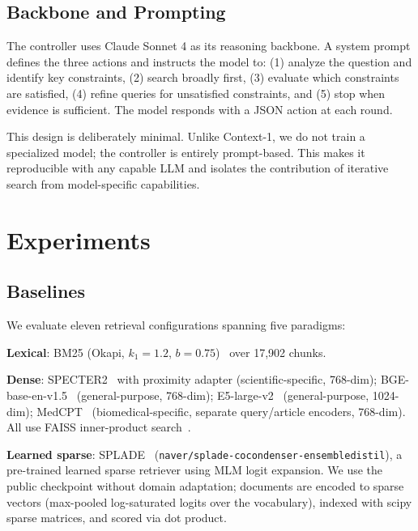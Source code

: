 \documentclass{article}
\begin{document}
\subsection{Backbone and Prompting}

The controller uses Claude Sonnet 4 as its reasoning backbone. A system prompt defines the three actions and instructs the model to: (1) analyze the question and identify key constraints, (2) search broadly first, (3) evaluate which constraints are satisfied, (4) refine queries for unsatisfied constraints, and (5) stop when evidence is sufficient. The model responds with a JSON action at each round.

This design is deliberately minimal. Unlike Context-1, we do not train a specialized model; the controller is entirely prompt-based. This makes it reproducible with any capable LLM and isolates the contribution of iterative search from model-specific capabilities.

\section{Experiments}
\label{sec:experiments}

\subsection{Baselines}

We evaluate eleven retrieval configurations spanning five paradigms:

\textbf{Lexical}: BM25 (Okapi, $k_1{=}1.2$, $b{=}0.75$)~\cite{robertson2009} over 17,902 chunks.

\textbf{Dense}: SPECTER2~\cite{specter2} with proximity adapter (scientific-specific, 768-dim); BGE-base-en-v1.5~\cite{bge2024} (general-purpose, 768-dim); E5-large-v2~\cite{e52022} (general-purpose, 1024-dim); MedCPT~\cite{medcpt2023} (biomedical-specific, separate query/article encoders, 768-dim). All use FAISS inner-product search~\cite{johnson2019faiss}.

\textbf{Learned sparse}: SPLADE~\cite{splade2022} (\texttt{naver/splade-cocondenser-ensembledistil}), a pre-trained learned sparse retriever using MLM logit expansion. We use the public checkpoint without domain adaptation; documents are encoded to sparse vectors (max-pooled log-saturated logits over the vocabulary), indexed with scipy sparse matrices, and scored via dot product.
\end{document}
